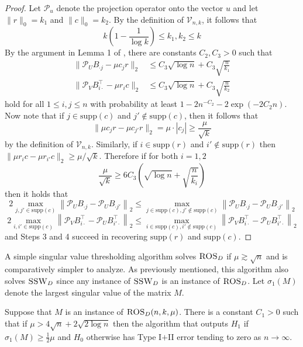 \begin{proof}
Let $\mathcal{P}_u$ denote the projection operator onto the vector $u$ and let $\| r \|_0 = k_1$ and $\| c \|_0 = k_2$. By the definition of $\mathcal{V}_{n, k}$, it follows that
$$k\left( 1 - \frac{1}{\log k} \right) \le k_1, k_2 \le k$$
By the argument in Lemma 1 of \cite{cai2015computational}, there are constants $C_2, C_3 > 0$ such that
\begin{align*}
\| \mathcal{P}_{U} B_{\cdot j} - \mu c_j r \|_2 &\le C_3 \sqrt{\log n} + C_3\sqrt{\frac{n}{k_1}} \\
\| \mathcal{P}_{V} B_{i \cdot}^\top - \mu r_i c \|_2 &\le C_3 \sqrt{\log n} + C_3 \sqrt{\frac{n}{k_2}}
\end{align*}
hold for all $1 \le i, j \le n$ with probability at least $1 - 2n^{-C_2} - 2\exp(-2C_2n)$. Now note that if $j \in \text{supp}(c)$ and $j' \not \in \text{supp}(c)$, then it follows that
$$\| \mu c_j r - \mu c_{j'} r \|_2 = \mu \cdot |c_j| \ge \frac{\mu}{\sqrt{k}}$$
by the definition of $\mathcal{V}_{n, k}$. Similarly, if $i \in \text{supp}(r)$ and $i' \not \in \text{supp}(r)$ then $\| \mu r_i c - \mu r_{i'} c \|_2 \ge \mu/\sqrt{k}$. Therefore if for both $i = 1, 2$
$$\frac{\mu}{\sqrt{k}} \ge 6 C_3 \left( \sqrt{\log n} + \sqrt{\frac{n}{k_i}} \right)$$
then it holds that
$$2 \max_{j, j' \in \text{supp}(c)} \left\| \mathcal{P}_U B_{\cdot j} - \mathcal{P}_U B_{\cdot j'} \right\|_2 \le \max_{j\in \text{supp}(c), j' \not \in \text{supp}(c)} \left\| \mathcal{P}_U B_{\cdot j} - \mathcal{P}_U B_{\cdot j'} \right\|_2$$
$$2 \max_{i, i' \in \text{supp}(c)} \left\| \mathcal{P}_V B_{i \cdot}^\top - \mathcal{P}_U B_{i' \cdot}^\top \right\|_2 \le \max_{i\in \text{supp}(c), i' \not \in \text{supp}(c)} \left\| \mathcal{P}_V B_{i \cdot}^\top - \mathcal{P}_U B_{i' \cdot}^\top \right\|_2$$
and Steps 3 and 4 succeed in recovering $\text{supp}(r)$ and $\text{supp}(c)$.
\end{proof}

A simple singular value thresholding algorithm solves $\textsc{ROS}_D$ if $\mu \gtrsim \sqrt{n}$ and is comparatively simpler to analyze. As previously mentioned, this algorithm also solves $\textsc{SSW}_D$ since any instance of $\textsc{SSW}_D$ is an instance of $\textsc{ROS}_D$. Let $\sigma_1(M)$ denote the largest singular value of the matrix $M$. 

\begin{theorem}
Suppose that $M$ is an instance of $\textsc{ROS}_D(n, k, \mu)$. There is a constant $C_1 > 0$ such that if $\mu > 4 \sqrt{n} + 2 \sqrt{2 \log n}$ then the algorithm that outputs $H_1$ if $\sigma_1(M) \ge \frac{1}{2} \mu$ and $H_0$ otherwise has Type I$+$II error tending to zero as $n \to \infty$.
\end{theorem}

